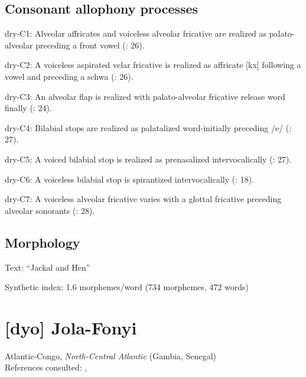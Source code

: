 {\subsection*{Consonant allophony processes}
\begin{appendixdesc}

\item[dry-C1:] Alveolar affricates and voiceless alveolar fricative are realized as palato-alveolar preceding a front vowel (\citealt{KotapishKotapish1973}: 26).

\item[dry-C2:] A voiceless aspirated velar fricative is realized as affricate [kx] following a vowel and preceding a schwa (\citealt{KotapishKotapish1973}: 26).

\item[dry-C3:] An alveolar flap is realized with palato-alveolar fricative release word finally (\citealt{KotapishKotapish1973}: 24).

\item[dry-C4:] Bilabial stops are realized as palatalized word-initially preceding /e/ (\citealt{KotapishKotapish1973}: 27).

\item[dry-C5:] A voiced bilabial stop is realized as prenasalized intervocalically (\citealt{KotapishKotapish1973}: 27).

\item[dry-C6:] A voiceless bilabial stop is spirantized intervocalically (\citealt{KotapishKotapish1973}: 18).

\item[dry-C7:] A voiceless alveolar fricative varies with a glottal fricative preceding alveolar sonorants (\citealt{KotapishKotapish1973}: 28).
\end{appendixdesc}
\subsection*{Morphology}

\begin{appendixdesc}

\item[Text:] “Jackal and Hen” \citep[180--192]{Dhakal2012}

\item[Synthetic index:] 1.6 morphemes/word (734 morphemes, 472 words)
\end{appendixdesc}
\section*{[dyo] Jola-Fonyi}  %
Atlantic-Congo, \textit{North-Central Atlantic} (Gambia, Senegal)\medskip\\
References consulted: \citet{Lavergne1979}, \citet{Sapir1965}

}
